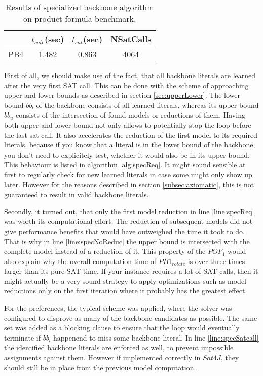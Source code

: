 \begin{wraptable}[7]{r}{8cm}
\begin{tabular}{l| c c c }
&	$t_{calc}$(sec) &	$t_{sat}$(sec)	& NSatCalls \\
\hline
PB4 & 1.482 & 0.863 & 4064 \\
\end{tabular}
\caption{Results of specialized backbone algorithm on product formula benchmark.}
\label{tab:thoreSpecialResults}
\end{wraptable}

First of all, we should make use of the fact, that all backbone literals are learned after the very first SAT call. This can be done with the scheme of approaching upper and lower bounds as described in section \ref{sec:upperLower}. The lower bound $bb_l$ of the backbone consists of all learned literals, whereas its upper bound $bb_u$ consists of the intersection of found models or reductions of them. Having both upper and lower bound not only allows to potentially stop the loop before the last sat call. It also accelerates the reduction of the first model to its required literals, because if you know that a literal is in the lower bound of the backbone, you don't need to explicitely test, whether it would also be in its upper bound. This behaviour is listed in algorithm \ref{alg:specReq}. It might sound sensible at first to regularly check for new learned literals in case some might only show up later. However for the reasons described in section \ref{subsec:axiomatic}, this is not guaranteed to result in valid backbone literals.

Secondly, it turned out, that only the first model reduction in line \ref{line:specReq} was worth its computational effort. The reduction of subsequent models did not give performance benefits that would have outweighed the time it took to do. That is why in line \ref{line:specNoReduc} the upper bound is intersected with the complete model instead of a reduction of it. This property of the $POF_1$ would also explain why the overall computation time of $PB1_{rotate}$ is over three times larger than its pure SAT time. If your instance requires a lot of SAT calls, then it might actually be a very sound strategy to apply optimizations such as model reductions only on the first iteration where it probably has the greatest effect. 

For the preferences, the typical scheme was applied, where the solver was configured to disprove as many of the backbone candidates as possible. The same set was added as a blocking clause to ensure that the loop would eventually terminate if $bb_l$ happenend to miss some backbone literal. In line \ref{line:specSatcall} the identified backbone literals are enforced as well, to prevent impossible assignments against them. However if implemented correctly in $Sat4J$, they should still be in place from the previous model computation.


